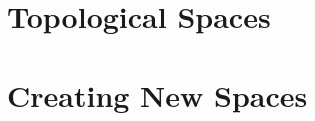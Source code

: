 \tableofcontents



\chapter{Topological Spaces}









\chapter{Creating New Spaces}


















































%